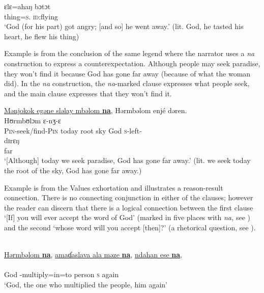       \medskip
\gll ɛlɛ=ahaŋ bɔtɔt\\      
     thing=\textsc{s}.{\POSS}  \textsc{id}:flying\\ 
\glt  ‘God (for his part) got angry; [and so] he went away.’ (lit. God, he tasted his heart, he flew his thing)
\z

Example  is from the conclusion of the same legend where the narrator uses a \textit{na} construction to express a counterexpectation. Although people may seek paradise, they won’t find it because God has gone far away (because of what the woman did). In the \textit{na} construction, the \textit{na}{}-marked clause expresses what people seek, and the main clause expresses that they won’t find it.


\ea \label{ex:11:18}
\underline{Mənjokok  egəne  sləlay  mbəlom  \textbf{na}},  Hərmbəlom  enjé  dəren.\\
\gll  {}            Hʊrmbʊlɔm ɛ-nʒ-ɛ\\ 
      \textsc{Pin}{}-seek/find-\textsc{Pin}  today  root  sky    {\PSP}  God  \textsc{s}-left-{\CL}\\  
      
      \medskip
\gll dɪrɛŋ\\      
     far\\ 
\glt  ‘[Although] today we seek paradise, God has gone far away.’ (lit. we seek today the root of the sky, God has gone far away.)
\z

Example  is from the Values exhortation and illustrates a reason-result connection. There is no connecting conjunction in either of the clauses; however the reader can discern that there is a logical connection between the first clause ‘[If] you will ever accept the word of God' (marked in five places with \textit{na,} see ) and the second ‘whose word will you accept [then]?' (a rhetorical question, see ).


\ea \label{ex:11:19}\\
\underline{Hərmbəlom  \textbf{na}},  \underline{amaɗaslava  ala  məze  \textbf{na}},  \underline{ndahan  ese  \textbf{na}},\\    
\gll  {}             \\ 
      God  {\PSP} {\DEP}-multiply=in=to   person {\PSP} \textsc{s}     again    {\PSP}\\    
\glt ‘God, the one who multiplied the people, him again’ \\
      
